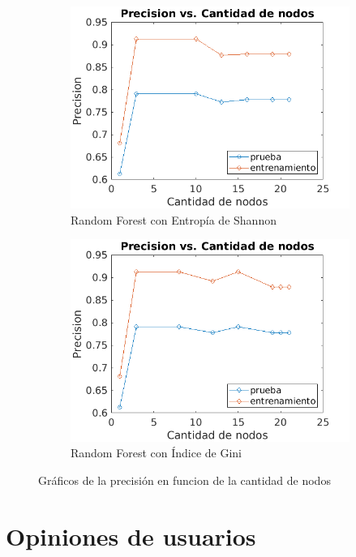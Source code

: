 \documentclass[a4paper]{article}
\begin{document}
\begin{figure}[h]
\begin{subfigure}{.4\textwidth}
    \includegraphics[width=\linewidth]{img/prec-rfshannon.png}
    \caption{Random Forest con Entropía de Shannon}
    \label{titanic-nodecount:sfig3}
  \end{subfigure}
  \begin{subfigure}{.4\textwidth}
    \centering
    \includegraphics[width=\linewidth]{img/prec-rfgini.png}
    \caption{Random Forest con Índice de Gini}
    \label{titanic-nodecount:sfig4}
  \end{subfigure}
  \caption{Gráficos de la precisión en funcion de la cantidad de nodos}
  \label{titanic-nodecount:fig}
\end{figure}

\section{Opiniones de usuarios}
\end{document}
